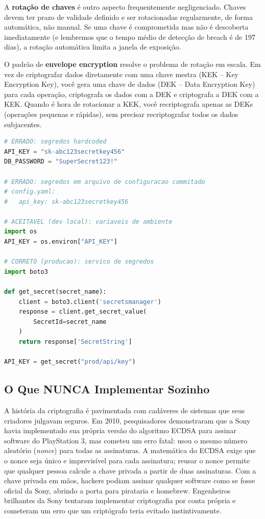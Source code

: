 A \textbf{rotação de chaves} é outro aspecto frequentemente negligenciado.
Chaves devem ter prazo de validade definido e ser rotacionadas regularmente,
de forma automática, não manual. Se uma chave é comprometida mas não é
descoberta imediatamente (e lembremos que o tempo médio de detecção de breach é
de 197 dias), a rotação automática limita a janela de exposição.

O padrão de \textbf{envelope encryption} resolve o problema de rotação em escala.
Em vez de criptografar dados diretamente com uma chave mestra (KEK -- Key
Encryption Key), você gera uma chave de dados (DEK -- Data Encryption Key) para
cada operação, criptografa os dados com a DEK e criptografa a DEK com a KEK.
Quando é hora de rotacionar a KEK, você recriptografa apenas as DEKs
(operações pequenas e rápidas), sem precisar recriptografar todos os dados
subjacentes.

\begin{lstlisting}[language=Python, caption={Gestão de segredos -- padrões}]
# ERRADO: segredos hardcoded
API_KEY = "sk-abc123secretkey456"
DB_PASSWORD = "SuperSecret123!"

# ERRADO: segredos em arquivo de configuracao commitado
# config.yaml:
#   api_key: sk-abc123secretkey456

# ACEITAVEL (dev local): variaveis de ambiente
import os
API_KEY = os.environ["API_KEY"]

# CORRETO (producao): servico de segredos
import boto3

def get_secret(secret_name):
    client = boto3.client('secretsmanager')
    response = client.get_secret_value(
        SecretId=secret_name
    )
    return response['SecretString']

API_KEY = get_secret("prod/api/key")
\end{lstlisting}

\subsection{O Que NUNCA Implementar Sozinho}

A história da criptografia é pavimentada com cadáveres de sistemas que seus
criadores julgavam seguros. Em 2010, pesquisadores demonstraram que a Sony havia
implementado sua própria versão do algoritmo ECDSA para assinar software do
PlayStation 3, mas cometeu um erro fatal: usou o mesmo número aleatório
(\textit{nonce}) para todas as assinaturas. A matemática do ECDSA exige que o
nonce seja único e imprevisível para cada assinatura; reusar o nonce permite
que qualquer pessoa calcule a chave privada a partir de duas assinaturas. Com a
chave privada em mãos, hackers podiam assinar qualquer software como se fosse
oficial da Sony, abrindo a porta para pirataria e homebrew. Engenheiros
brilhantes da Sony tentaram implementar criptografia por conta própria e
cometeram um erro que um criptógrafo teria evitado instintivamente.

